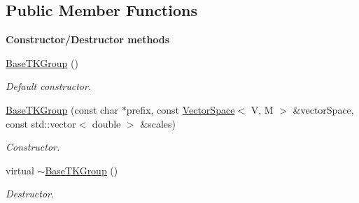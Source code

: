\subsection*{Public Member Functions}
\begin{Indent}{\bf Constructor/\-Destructor methods}\par
\begin{DoxyCompactItemize}
\item 
\hyperlink{class_q_u_e_s_o_1_1_base_t_k_group_ad4274236f2092a7307f4d5e4b0a480ee}{Base\-T\-K\-Group} ()
\begin{DoxyCompactList}\small\item\em Default constructor. \end{DoxyCompactList}\item 
\hyperlink{class_q_u_e_s_o_1_1_base_t_k_group_a94df2ec2ed0f8e3b8073df873f5bd0c9}{Base\-T\-K\-Group} (const char $\ast$prefix, const \hyperlink{class_q_u_e_s_o_1_1_vector_space}{Vector\-Space}$<$ V, M $>$ \&vector\-Space, const std\-::vector$<$ double $>$ \&scales)
\begin{DoxyCompactList}\small\item\em Constructor. \end{DoxyCompactList}\item 
virtual \hyperlink{class_q_u_e_s_o_1_1_base_t_k_group_a40fbcbbaf7977a83d38d76e1ef23f13f}{$\sim$\-Base\-T\-K\-Group} ()
\begin{DoxyCompactList}\small\item\em Destructor. \end{DoxyCompactList}\end{DoxyCompactItemize}
\end{Indent}
